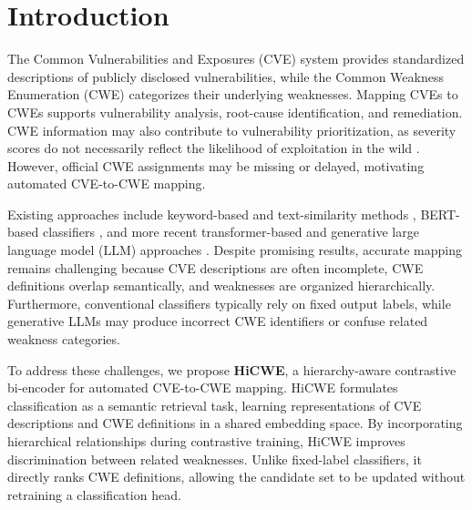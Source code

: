 \documentclass[conference,compsoc]{IEEEtran}
\begin{document}


\IEEEpeerreviewmaketitle

\section{Introduction}
\label{sec:introduction}

The Common Vulnerabilities and Exposures (CVE) system
provides standardized descriptions of publicly disclosed
vulnerabilities, while the Common Weakness Enumeration
(CWE) categorizes their underlying weaknesses.
Mapping CVEs to CWEs supports vulnerability analysis,
root-cause identification, and remediation. CWE information
may also contribute to vulnerability prioritization,
as severity scores do not necessarily reflect the
likelihood of exploitation in the wild
\cite{allodi2014comparing, jacobs2023epss}.
However, official CWE assignments may be missing or
delayed, motivating automated CVE-to-CWE mapping.

Existing approaches include keyword-based and
text-similarity methods \cite{albanese2024cve2cwe},
BERT-based classifiers \cite{das2021v2w},
and more recent transformer-based and generative
large language model (LLM) approaches \cite{mosievskiy2026roberta,liu2023not,simonetto2026knowing}.
Despite promising results, accurate mapping remains
challenging because CVE descriptions are often
incomplete, CWE definitions overlap semantically,
and weaknesses are organized hierarchically.
Furthermore, conventional classifiers typically
rely on fixed output labels, while generative
LLMs may produce incorrect CWE identifiers or
confuse related weakness categories.

To address these challenges, we propose
\textbf{HiCWE}, a hierarchy-aware contrastive
bi-encoder for automated CVE-to-CWE mapping.
HiCWE formulates classification as a semantic
retrieval task, learning representations of CVE
descriptions and CWE definitions in a shared
embedding space. By incorporating hierarchical
relationships during contrastive training,
HiCWE improves discrimination between related
weaknesses. Unlike fixed-label classifiers,
it directly ranks CWE definitions, allowing
the candidate set to be updated without
retraining a classification head.
\end{document}
